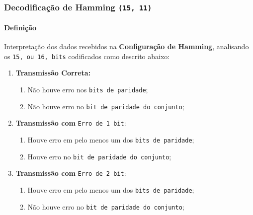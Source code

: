 \documentclass{article}
\begin{document}
        \subsubsection{Decodificação de Hamming \texttt{(15, 11)}}
            \paragraph{Definição}Interpretação dos dados recebidos na \textbf{Configuração de Hamming}, analisando os \texttt{15, ou 16, bits} codificados como descrito abaixo:
                \begin{enumerate}[rightmargin = \leftmargin]
                    \item \textbf{Transmissão Correta:} 
                        \begin{enumerate}[noitemsep, rightmargin = \leftmargin]
                            \item Não houve erro nos \textcolor{red!80}{\texttt{bits de paridade}};
                            \item Não houve erro no \textcolor{blue!80}{\texttt{bit de paridade do conjunto}};
                        \end{enumerate}

                    \item \textbf{Transmissão com} \texttt{Erro de 1 bit}:
                        \begin{enumerate}[noitemsep, rightmargin = \leftmargin]
                            \item Houve erro em pelo menos um dos \textcolor{red!80}{\texttt{bits de paridade}};
                            \item Houve erro no \textcolor{blue!80}{\texttt{bit de paridade do conjunto}};
                        \end{enumerate}

                    \item \textbf{Transmissão com} \texttt{Erro de 2 bit}:
                        \begin{enumerate}[noitemsep, rightmargin = \leftmargin]
                            \item Houve erro em pelo menos um dos \textcolor{red!80}{\texttt{bits de paridade}};
                            \item Não houve erro no \textcolor{blue!80}{\texttt{bit de paridade do conjunto}};
                        \end{enumerate}
                \end{enumerate}
\end{document}
